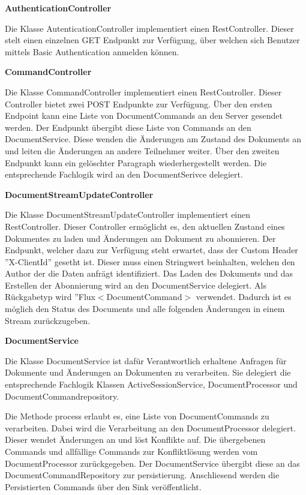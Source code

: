 \textbf{AuthenticationController}

Die Klasse AutenticationController implementiert einen RestController.
Dieser stelt einen einzelnen GET Endpunkt zur Verfügung, über welchen sich Benutzer mittels Basic Authentication anmelden können.

\textbf{CommandController}

Die Klasse CommandController implementiert einen RestController.
Dieser Controller bietet zwei POST Endpunkte zur Verfügung.
Über den ersten Endpoint kann eine Liste von DocumentCommands an den Server gesendet werden.
Der Endpunkt übergibt diese Liste von Commands an den DocumentService.
Diese wenden die Änderungen am Zustand des Dokuments an und leiten die Änderungen an andere Teilnehmer weiter.
Über den zweiten Endpunkt kann ein gelöschter Paragraph wiederhergestellt werden.
Die entsprechende Fachlogik wird an den DocumentSerivce delegiert.

\textbf{DocumentStreamUpdateController}

Die Klasse DocumentStreamUpdateController implementiert einen RestController.
Dieser Controller ermöglicht es, den aktuellen Zustand eines Dokumentes zu laden und Änderungen am Dokument zu abonnieren.
Der Endpunkt, welcher dazu zur Verfügung steht erwartet, dass der Custom Header ''X-ClientId'' gesetht ist.
Dieser muss einen Stringwert beinhalten, welchen den Author der die Daten anfrägt identifiziert.
Das Laden des Dokuments und das Erstellen der Abonnierung wird an den DocumentService delegiert.
Als Rückgabetyp wird ''Flux$<$DocumentCommand$>$ verwendet.
Dadurch ist es möglich den Status des Documents und alle folgenden Änderungen in einem Stream zurückzugeben.

\textbf{DocumentService}

Die Klasse DocumentService ist dafür Verantwortlich erhaltene Anfragen für Dokumente und Änderungen an Dokumenten zu verarbeiten.
Sie delegiert die entsprechende Fachlogik Klassen ActiveSessionService, DocumentProcessor und DocumentCommandrepository.

Die Methode process erlaubt es, eine Liste von DocumentCommands zu verarbeiten.
Dabei wird die Verarbeitung an den DocumentProcessor delegiert.
Dieser wendet Änderungen an und löst Konflikte auf.
Die übergebenen Commands und allfällige Commands zur Konfliktlösung werden vom DocumentProcessor zurückgegeben.
Der DocumentService übergibt diese an das DocumentCommandRepository zur persistierung.
Anschliesend werden die Persistierten Commands über den Sink veröffentlicht.

